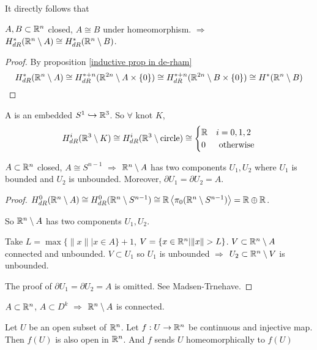 It directly follows that
\begin{theorem}
     $ A,B\subset \mathbb R^n  $ closed,  $ A\cong B  $ under homeomorphism.  $ \Rightarrow  $  $ H_{dR}^*(\mathbb R^n\setminus A)\cong H_{dR}^*(\mathbb R^n\setminus B) $. 
\end{theorem}
\begin{proof}By proposition \ref{inductive prop in de-rham}
    \[H^*_{dR}(\mathbb R^n\setminus A)\cong H_{dR}^{*+n}(\mathbb R^{2n}\setminus A\times\{0\})\cong H_{dR}^{*+n}(\mathbb R^{2n}\setminus B\times\{0\})\cong H^*(\mathbb R^n\setminus B)\]
\end{proof}
\begin{example}
    A  is an embedded  $ S^1\hookrightarrow \mathbb R^3 $. So  $ \forall  $ knot  $ K $,
    \begin{equation}
        H_{dR}^i(\mathbb R^3\setminus K)\cong H_{dR}^i(\mathbb R^3\setminus\text{circle})\cong \begin{cases}
            \mathbb R&i=0,1,2\\
            0&\text{ otherwise}
        \end{cases}
    \end{equation}  
\end{example}
\begin{corollary}
     $ A\subset \mathbb R^n $ closed,  $ A\cong S^{n-1} $ $ \Rightarrow  $  $ \mathbb R^n\setminus A  $ has two components  $ U_1,U_2 $ where  $ U_1 $ is bounded and  $ U_2 $ is unbounded. Moreover,      $ \partial U_1=\partial U_2=A $.  
\end{corollary}
\begin{proof}
     $ H_{dR}^0(\mathbb R^n\setminus A) \cong H_{dR}^0(\mathbb R^n\setminus S^{n-1})\cong \mathbb R\left<\pi_0(\mathbb R^n\setminus S^{n-1})\right>=\mathbb R\oplus \mathbb R$.

    So  $ \mathbb R^n\setminus A $ has two components  $ U_1,U_2 $.
    
    Take  $ L=\max\{\|x\||x\in A\}+1 $, $ V=\{x\in \Rbb^n|\|x\|>L\} $.  $ V\subset \mathbb R^n\setminus A $ connected and unbounded. $ V\subset U_1  $ so  $ U_1  $ is unbounded  $ \Rightarrow  $  $ U_2\subset \mathbb R^n\setminus V $ is unbounded.
    
    The proof of $ \partial U_1=\partial U_2=A $ is omitted. See Madsen-Trnehave.
\end{proof}
\begin{corollary}
     $ A\subset \mathbb R^n $,  $ A\subset D^k $ $ \Rightarrow  $  $ \mathbb R^n\setminus A $ is connected.   
\end{corollary}
\begin{theorem}\label{Invariance of domain}
    Let  $ U  $ be an open subset of  $ \mathbb R^n  $. Let $ f:U\rightarrow \mathbb R^n  $ be continuous and injective map. Then  $ f(U) $ is also open in  $ \mathbb R^n $. And  $ f  $ sends  $ U  $ homeomorphically to  $ f(U) $  
\end{theorem}
